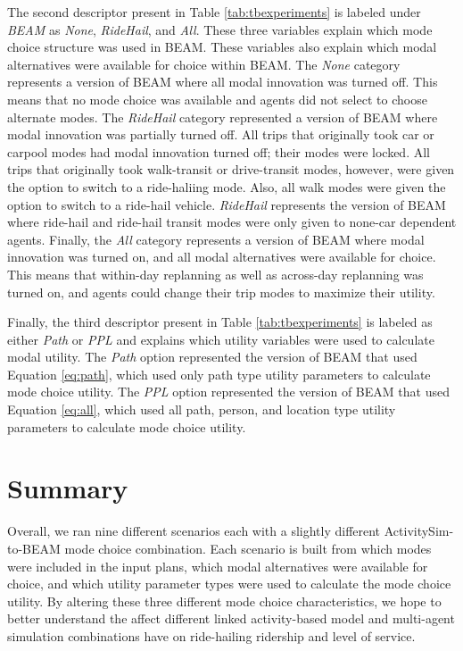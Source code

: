 \documentclass[simple, masters, twoside]{byuthesis}
\begin{document}
The second descriptor present in Table \ref{tab:tbexperiments} is labeled under \emph{BEAM} as \emph{None}, \emph{RideHail}, and \emph{All}. These three variables explain which mode choice structure was used in BEAM. These variables also explain which modal alternatives were available for choice within BEAM. The \emph{None} category represents a version of BEAM where all modal innovation was turned off. This means that no mode choice was available and agents did not select to choose alternate modes. The \emph{RideHail} category represented a version of BEAM where modal innovation was partially turned off. All trips that originally took car or carpool modes had modal innovation turned off; their modes were locked. All trips that originally took walk-transit or drive-transit modes, however, were given the option to switch to a ride-haliing mode. Also, all walk modes were given the option to switch to a ride-hail vehicle. \emph{RideHail} represents the version of BEAM where ride-hail and ride-hail transit modes were only given to none-car dependent agents. Finally, the \emph{All} category represents a version of BEAM where modal innovation was turned on, and all modal alternatives were available for choice. This means that within-day replanning as well as across-day replanning was turned on, and agents could change their trip modes to maximize their utility.

Finally, the third descriptor present in Table \ref{tab:tbexperiments} is labeled as either \emph{Path} or \emph{PPL} and explains which utility variables were used to calculate modal utility. The \emph{Path} option represented the version of BEAM that used Equation \eqref{eq:path}, which used only path type utility parameters to calculate mode choice utility. The \emph{PPL} option represented the version of BEAM that used Equation \eqref{eq:all}, which used all path, person, and location type utility parameters to calculate mode choice utility.

\hypertarget{summary-1}{%
\section{Summary}\label{summary-1}}

Overall, we ran nine different scenarios each with a slightly different ActivitySim-to-BEAM mode choice combination. Each scenario is built from which modes were included in the input plans, which modal alternatives were available for choice, and which utility parameter types were used to calculate the mode choice utility. By altering these three different mode choice characteristics, we hope to better understand the affect different linked activity-based model and multi-agent simulation combinations have on ride-hailing ridership and level of service.
\end{document}
